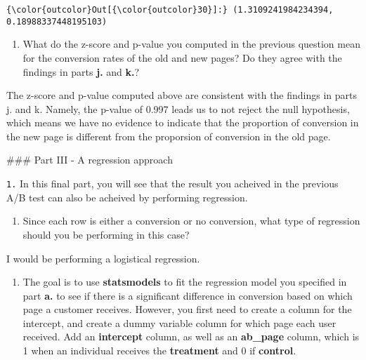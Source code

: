 \documentclass[11pt]{article}
\providecommand{\tightlist}{%
      \setlength{\itemsep}{0pt}\setlength{\parskip}{0pt}}
\begin{document}
\begin{Verbatim}[commandchars=\\\{\}]
{\color{outcolor}Out[{\color{outcolor}30}]:} (1.3109241984234394, 0.18988337448195103)
\end{Verbatim}
            
    \begin{enumerate}
\def\labelenumi{\alph{enumi}.}
\setcounter{enumi}{13}
\tightlist
\item
  What do the z-score and p-value you computed in the previous question
  mean for the conversion rates of the old and new pages? Do they agree
  with the findings in parts \textbf{j.} and \textbf{k.}?
\end{enumerate}

    The z-score and p-value computed above are consistent with the findings
in parts j. and k. Namely, the p-value of 0.997 leads us to not reject
the null hypothesis, which means we have no evidence to indicate that
the proportion of conversion in the new page is different from the
proporsion of conversion in the old page.

     \#\#\# Part III - A regression approach

\texttt{1.} In this final part, you will see that the result you
acheived in the previous A/B test can also be acheived by performing
regression.

\begin{enumerate}
\def\labelenumi{\alph{enumi}.}
\tightlist
\item
  Since each row is either a conversion or no conversion, what type of
  regression should you be performing in this case?
\end{enumerate}

    I would be performing a logistical regression.

    \begin{enumerate}
\def\labelenumi{\alph{enumi}.}
\setcounter{enumi}{1}
\tightlist
\item
  The goal is to use \textbf{statsmodels} to fit the regression model
  you specified in part \textbf{a.} to see if there is a significant
  difference in conversion based on which page a customer receives.
  However, you first need to create a column for the intercept, and
  create a dummy variable column for which page each user received. Add
  an \textbf{intercept} column, as well as an \textbf{ab\_page} column,
  which is 1 when an individual receives the \textbf{treatment} and 0 if
  \textbf{control}.
\end{enumerate}
\end{document}
